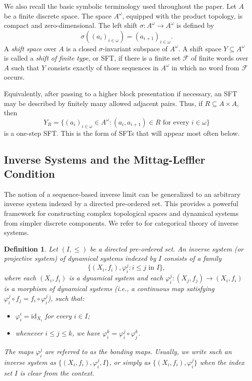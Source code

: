 \documentclass[10pt,a4paper]{amsart}
\newtheorem{definition}[theorem]{Definition}
\numberwithin{equation}{section}
\begin{document}
We also recall the basic symbolic terminology used throughout the paper. Let
$A$ be a finite discrete space. The space $A^\omega$, equipped with the product
topology, is compact and zero-dimensional. The left shift
$\sigma:A^\omega\to A^\omega$ is defined by
\[
    \sigma((a_i)_{i\in\omega})=(a_{i+1})_{i\in\omega}.
\]
A \emph{shift space} over $A$ is a closed $\sigma$-invariant subspace of
$A^\omega$. A shift space $Y\subseteq A^\omega$ is called a \emph{shift of
finite type}, or SFT, if there is a finite set $\mathcal F$ of finite words over
$A$ such that $Y$ consists exactly of those sequences in $A^\omega$ in which no
word from $\mathcal F$ occurs.

Equivalently, after passing to a higher block presentation if necessary, an SFT
may be described by finitely many allowed adjacent pairs. Thus, if
$R\subseteq A\times A$, then
\[
    Y_R=\{(a_i)_{i\in\omega}\in A^\omega:(a_i,a_{i+1})\in R
    \text{ for every }i\in\omega\}
\]
is a one-step SFT. This is the form of SFTs that will appear most often below.

\subsection{Inverse Systems and the Mittag-Leffler Condition}
The notion of a sequence-based inverse limit can be generalized to an arbitrary inverse system indexed by a directed pre-ordered set. This provides a powerful framework for constructing complex topological spaces and dynamical systems from simpler discrete components. We refer to \cite{MSeg} for categorical theory of inverse systems.

\begin{definition}
Let $(I,\le)$ be a directed pre-ordered set. An \emph{inverse system (or projective system) of dynamical systems} indexed by $I$ consists of a family
\[
\{(X_i,f_i),\varphi_i^j : i\le j \text{ in } I\},
\]
where each $(X_i,f_i)$ is a dynamical system and each $\varphi_i^j:(X_j,f_j)\to (X_i,f_i)$ is a morphism of dynamical systems (i.e., a continuous map satisfying $\varphi_i^j \circ f_j = f_i \circ \varphi_i^j$), such that:
\begin{itemize}
\item $\varphi_i^i=\mathrm{id}_{X_i}$ for every $i\in I$;
\item whenever $i\le j\le k$, we have $\varphi_i^k = \varphi_i^j\circ \varphi_j^k$.
\end{itemize}
The maps $\varphi_i^j$ are referred to as the \emph{bonding maps}. Usually, we write such an inverse system as $\{(X_i,f_i),\varphi_i^j,I\}$, or simply as $\{(X_i,f_i),\varphi_i^j\}$ when the index set $I$ is clear from the context.
\end{definition}
\end{document}
